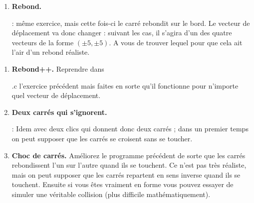 \documentclass[11pt,a4paper]{article}
\newcommand{\checkbox}{$\square$ \smallskip}
\newcounter{exo} \setcounter{exo}{0}
\newenvironment{action}{%
    \begin{enumerate}[\numerotation] \addtocounter{exo}{-1}%
        }{%
    \end{enumerate}
}
\newcommand{\numexoa}{\theexo \addtocounter{exo}{1}}
\newcommand{\numerotation}{\checkbox \smallskip \numexoa.}
\newcounter{exoo} \setcounter{exoo}{0}
\newcommand{\numexo}{\theexoo}
\newcommand{\repexo}{{\tt exo_\numexo}}
\newcommand{\exoplus}{\addtocounter{exoo}{1}}
\begin{document}
\begin{action}
\item {\bf Rebond.} \exoplus \repexo : même exercice, mais cette fois-ci le carré rebondit sur le bord. Le vecteur de déplacement va donc changer : suivant les cas, il s'agira d'un des quatre vecteurs de la forme $(\pm5,\pm5)$. A vous de trouver lequel pour que cela ait l'air d'un rebond réaliste.
\end{action}


\begin{action}
\item {\bf Rebond++.} Reprendre dans \exoplus \repexo.c l'exercice précédent mais faites en sorte qu'il fonctionne pour n'importe quel vecteur de déplacement.
\item {\bf Deux carrés qui s'ignorent.} \exoplus \repexo : Idem avec deux clics qui donnent donc deux carrés ; dans un premier temps on peut supposer que les carrés se croisent sans se toucher.
\item {\bf Choc de carrés.} Améliorez le programme précédent de sorte que les carrés rebondissent l'un sur l'autre quand ils se touchent. Ce n'est pas très réaliste, mais on peut supposer que les carrés repartent en sens inverse quand ils se touchent. Ensuite si vous êtes vraiment en forme vous pouvez essayer de simuler une véritable collision (plus difficile mathématiquement).
\end{action}
\end{document}
